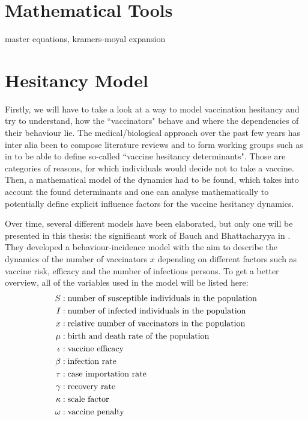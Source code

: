 \documentclass[12pt,a4paper,twoside]{article}
\begin{document}
\section{Mathematical Tools} %
master equations, kramers-moyal expansion

\section{Hesitancy Model}
Firstly, we will have to take a look at a way to model vaccination hesitancy and try to understand, how the ``vaccinators" behave and where the dependencies of their behaviour lie. The medical/biological approach over the past few years has inter alia been to compose literature reviews and to form working groups such as in \cite{MacDonald2015} to be able to define so-called ``vaccine hesitancy determinants". Those are categories of reasons, for which individuals would decide not to take a vaccine. Then, a mathematical model of the dynamics had to be found, which takes into account the found determinants and one can analyse mathematically to potentially define explicit influence factors for the vaccine hesitancy dynamics. 

Over time, several different models have been elaborated, but only one will be presented in this thesis: the significant work of Bauch and Bhattacharyya in \cite{Bauch2012}. They developed a behaviour-incidence model with the aim to describe the dynamics of the number of vaccinators $x$ depending on different factors such as vaccine risk, efficacy and the number of infectious persons. To get a better overview, all of the variables used in the model will be listed here:
\begin{align}\label{table:bauch_model_variables}
\begin{split}
S &: \textnormal{number of susceptible individuals in the population}\\
I &: \textnormal{number of infected individuals in the population}\\
x &: \textnormal{relative number of vaccinators in the population}\\
\mu &: \textnormal{birth and death rate of the population}\\
\epsilon &: \textnormal{vaccine efficacy}\\
\beta &: \textnormal{infection rate}\\
\tau &: \textnormal{case importation rate}\\
\gamma &: \textnormal{recovery rate}\\
\kappa &: \textnormal{scale factor}\\
\omega &: \textnormal{vaccine penalty}
\end{split}
\end{align}
\end{document}
